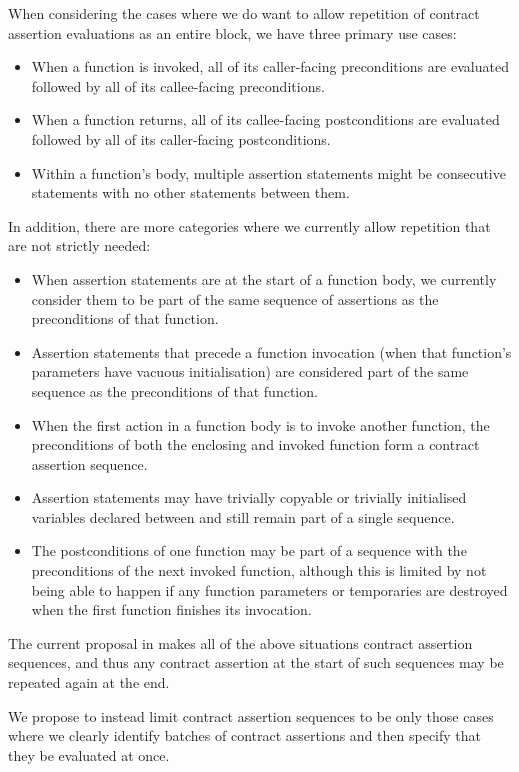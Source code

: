 When considering the cases where we do want to allow repetition
of contract assertion evaluations as an entire block,
we have three primary use cases:
\begin{itemize}
\item{When a function is invoked, all of its caller-facing preconditions
  are evaluated followed by all of its callee-facing preconditions.}
\item{When a function returns, all of its callee-facing postconditions
  are evaluated followed by all of its caller-facing postconditions.}
\item{Within a function's body, multiple assertion statements might be
  consecutive statements with no other statements between them.}
\end{itemize}          
In addition, there are more categories where we currently
allow repetition that are not strictly needed:
\begin{itemize}
\item{When assertion statements are at the start of a function body,
we currently consider them to be part of the same sequence of assertions
as the preconditions of that function.}
\item{Assertion statements that precede a function invocation (when
that function's parameters have vacuous initialisation) are considered
part of the same sequence as the preconditions of that function.}
\item{When the first action in a function body is to invoke another
function, the preconditions of both the enclosing and invoked function
form a contract assertion sequence.}
\item{Assertion statements may have trivially copyable or trivially initialised
variables declared between and still remain part of a single sequence.}
\item{The postconditions of one function may be part of a sequence
with the preconditions of the next invoked function, although this is limited
by not being able to happen if any function parameters or temporaries are
destroyed when the first function finishes its invocation.}
\end{itemize}

The current proposal in \cite{P2900R11} makes all of the above situations
contract assertion sequences, and thus any contract assertion at the start
of such sequences may be repeated again at the end.

We propose to instead limit contract assertion sequences to be only
those cases where we clearly identify batches of contract assertions
and then specify that they be evaluated at once.

